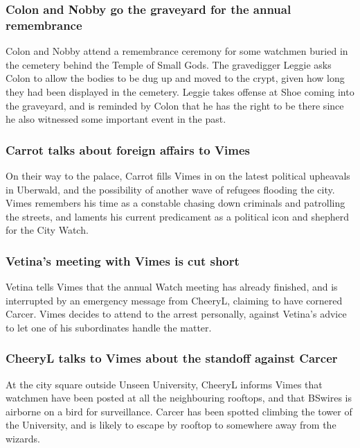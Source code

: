 \subsubsection{\Gls{Colon} and \Gls{Nobby} go the graveyard for the annual remembrance}
\Gls{Colon} and \Gls{Nobby} attend a remembrance ceremony for some watchmen buried in the cemetery
behind the Temple of Small Gods. The gravedigger \Gls{Leggie} asks \Gls{Colon} to allow the bodies
to be dug up and moved to the crypt, given how long they had been displayed in the cemetery.
\Gls{Leggie} takes offense at \Gls{Shoe} coming into the graveyard, and is reminded by \Gls{Colon}
that he has the right to be there since he also witnessed some important event in the past.

\subsubsection{\Gls{Carrot} talks about foreign affairs to \Gls{Vimes}}
On their way to the palace, \Gls{Carrot} fills \Gls{Vimes} in on the latest political upheavals in
Uberwald, and the possibility of another wave of refugees flooding the city. \Gls{Vimes}
remembers his time as a constable chasing down criminals and patrolling the streets, and laments his
current predicament as a political icon and shepherd for the City Watch.

\subsubsection{\Gls{Vetina}'s meeting with \Gls{Vimes} is cut short}
\Gls{Vetina} tells \Gls{Vimes} that the annual Watch meeting has already finished, and is
interrupted by an emergency message from \Gls{CheeryL}, claiming to have cornered \Gls{Carcer}.
\Gls{Vimes} decides to attend to the arrest personally, against \Gls{Vetina}'s advice to let one of
his subordinates handle the matter.

\subsubsection{\Gls{CheeryL} talks to \Gls{Vimes} about the standoff against \Gls{Carcer}}
At the city square outside Unseen University, \Gls{CheeryL} informs \Gls{Vimes} that watchmen have
been posted at all the neighbouring rooftops, and that \Gls{BSwires} is airborne on a bird for
surveillance. \Gls{Carcer} has been spotted climbing the tower of the University, and is likely to
escape by rooftop to somewhere away from the wizards.

